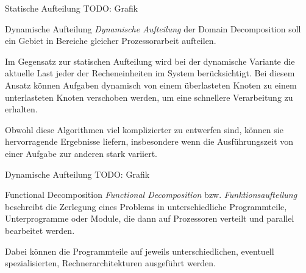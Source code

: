 \begin{example}{Statische Aufteilung}
    TODO: Grafik
\end{example}

\begin{defi}{Dynamische Aufteilung}
    \emph{Dynamische Aufteilung} der Domain Decomposition soll ein Gebiet in Bereiche gleicher Prozessorarbeit aufteilen.

    Im Gegensatz zur statischen Aufteilung wird bei der dynamische Variante die aktuelle Last jeder der Recheneinheiten im System berücksichtigt.
    Bei diesem Ansatz können Aufgaben dynamisch von einem überlasteten Knoten zu einem unterlasteten Knoten verschoben werden, um eine schnellere Verarbeitung zu erhalten.

    Obwohl diese Algorithmen viel komplizierter zu entwerfen sind, können sie hervorragende Ergebnisse liefern, insbesondere wenn die Ausführungszeit von einer Aufgabe zur anderen stark variiert.

\end{defi}

\begin{example}{Dynamische Aufteilung}
    TODO: Grafik
\end{example}

\begin{defi}{Functional Decomposition}
    \emph{Functional Decomposition} bzw. \emph{Funktionsaufteilung} beschreibt die Zerlegung eines Problems in unterschiedliche Programmteile, Unterprogramme oder Module, die dann auf Prozessoren verteilt und parallel bearbeitet werden.

    Dabei können die Programmteile auf jeweils unterschiedlichen, eventuell spezialisierten, Rechnerarchitekturen ausgeführt werden.
\end{defi}

